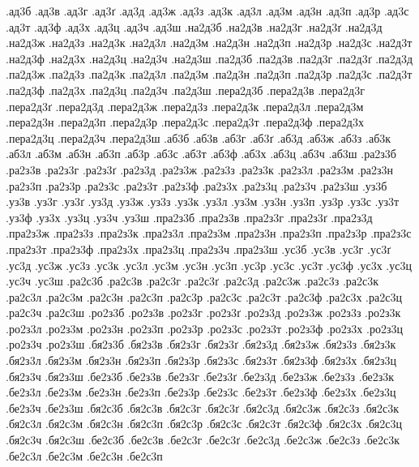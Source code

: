 {%
%
%
.ад3б
.ад3в
.ад3г
.ад3ґ
.ад3д
.ад3ж
.ад3з
.ад3к
.ад3л
.ад3м
.ад3н
.ад3п
.ад3р
.ад3с
.ад3т
.ад3ф
.ад3х
.ад3ц
.ад3ч
.ад3ш
.на2д3б
.на2д3в
.на2д3г
.на2д3ґ
.на2д3д
.на2д3ж
.на2д3з
.на2д3к
.на2д3л
.на2д3м
.на2д3н
.на2д3п
.на2д3р
.на2д3с
.на2д3т
.на2д3ф
.на2д3х
.на2д3ц
.на2д3ч
.на2д3ш
.па2д3б
.па2д3в
.па2д3г
.па2д3ґ
.па2д3д
.па2д3ж
.па2д3з
.па2д3к
.па2д3л
.па2д3м
.па2д3н
.па2д3п
.па2д3р
.па2д3с
.па2д3т
.па2д3ф
.па2д3х
.па2д3ц
.па2д3ч
.па2д3ш
.пера2д3б
.пера2д3в
.пера2д3г
.пера2д3ґ
.пера2д3д
.пера2д3ж
.пера2д3з
.пера2д3к
.пера2д3л
.пера2д3м
.пера2д3н
.пера2д3п
.пера2д3р
.пера2д3с
.пера2д3т
.пера2д3ф
.пера2д3х
.пера2д3ц
.пера2д3ч
.пера2д3ш
.аб3б
.аб3в
.аб3г
.аб3ґ
.аб3д
.аб3ж
.аб3з
.аб3к
.аб3л
.аб3м
.аб3н
.аб3п
.аб3р
.аб3с
.аб3т
.аб3ф
.аб3х
.аб3ц
.аб3ч
.аб3ш
.ра2з3б
.ра2з3в
.ра2з3г
.ра2з3ґ
.ра2з3д
.ра2з3ж
.ра2з3з
.ра2з3к
.ра2з3л
.ра2з3м
.ра2з3н
.ра2з3п
.ра2з3р
.ра2з3с
.ра2з3т
.ра2з3ф
.ра2з3х
.ра2з3ц
.ра2з3ч
.ра2з3ш
.уз3б
.уз3в
.уз3г
.уз3ґ
.уз3д
.уз3ж
.уз3з
.уз3к
.уз3л
.уз3м
.уз3н
.уз3п
.уз3р
.уз3с
.уз3т
.уз3ф
.уз3х
.уз3ц
.уз3ч
.уз3ш
.пра2з3б
.пра2з3в
.пра2з3г
.пра2з3ґ
.пра2з3д
.пра2з3ж
.пра2з3з
.пра2з3к
.пра2з3л
.пра2з3м
.пра2з3н
.пра2з3п
.пра2з3р
.пра2з3с
.пра2з3т
.пра2з3ф
.пра2з3х
.пра2з3ц
.пра2з3ч
.пра2з3ш
.ус3б
.ус3в
.ус3г
.ус3ґ
.ус3д
.ус3ж
.ус3з
.ус3к
.ус3л
.ус3м
.ус3н
.ус3п
.ус3р
.ус3с
.ус3т
.ус3ф
.ус3х
.ус3ц
.ус3ч
.ус3ш
.ра2с3б
.ра2с3в
.ра2с3г
.ра2с3ґ
.ра2с3д
.ра2с3ж
.ра2с3з
.ра2с3к
.ра2с3л
.ра2с3м
.ра2с3н
.ра2с3п
.ра2с3р
.ра2с3с
.ра2с3т
.ра2с3ф
.ра2с3х
.ра2с3ц
.ра2с3ч
.ра2с3ш
.ро2з3б
.ро2з3в
.ро2з3г
.ро2з3ґ
.ро2з3д
.ро2з3ж
.ро2з3з
.ро2з3к
.ро2з3л
.ро2з3м
.ро2з3н
.ро2з3п
.ро2з3р
.ро2з3с
.ро2з3т
.ро2з3ф
.ро2з3х
.ро2з3ц
.ро2з3ч
.ро2з3ш
.бя2з3б
.бя2з3в
.бя2з3г
.бя2з3ґ
.бя2з3д
.бя2з3ж
.бя2з3з
.бя2з3к
.бя2з3л
.бя2з3м
.бя2з3н
.бя2з3п
.бя2з3р
.бя2з3с
.бя2з3т
.бя2з3ф
.бя2з3х
.бя2з3ц
.бя2з3ч
.бя2з3ш
.бе2з3б
.бе2з3в
.бе2з3г
.бе2з3ґ
.бе2з3д
.бе2з3ж
.бе2з3з
.бе2з3к
.бе2з3л
.бе2з3м
.бе2з3н
.бе2з3п
.бе2з3р
.бе2з3с
.бе2з3т
.бе2з3ф
.бе2з3х
.бе2з3ц
.бе2з3ч
.бе2з3ш
.бя2с3б
.бя2с3в
.бя2с3г
.бя2с3ґ
.бя2с3д
.бя2с3ж
.бя2с3з
.бя2с3к
.бя2с3л
.бя2с3м
.бя2с3н
.бя2с3п
.бя2с3р
.бя2с3с
.бя2с3т
.бя2с3ф
.бя2с3х
.бя2с3ц
.бя2с3ч
.бя2с3ш
.бе2с3б
.бе2с3в
.бе2с3г
.бе2с3ґ
.бе2с3д
.бе2с3ж
.бе2с3з
.бе2с3к
.бе2с3л
.бе2с3м
.бе2с3н
.бе2с3п
}
